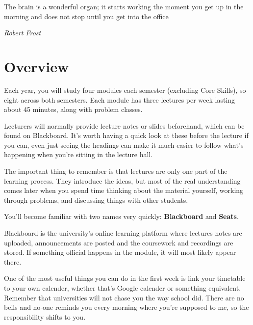 \epigraph{The brain is a wonderful organ; it starts working the moment you get up in the morning and does not stop until you get into the office}
{\textit{Robert Frost}}

\section{Overview}


Each year, you will study four modules each semester (excluding Core Skills), so eight across both semesters. Each module has three lectures per week lasting about 45 minutes, along with problem classes. 

Lecturers will normally provide lecture notes or slides beforehand, which can be found on Blackboard. It’s worth having a quick look at these before the lecture if you can, even just seeing the headings can make it much easier to follow what’s happening when you’re sitting in the lecture hall.

The important thing to remember is that lectures are only one part of the learning process. They introduce the ideas, but most of the real understanding comes later when you spend time thinking about the material yourself, working through problems, and discussing things with other students.




You'll become familiar with two names very quickly: \textbf{Blackboard} and \textbf{Seats}. 

Blackboard is the university's online learning platform where lectures notes are uploaded, announcements are posted and the coursework and recordings are stored. If something official happens in the module, it will most likely appear there. 

One of the most useful things you can do in the first week is link your timetable to your own calender, whether that's Google calender or something equivalent. Remember that universities will not chase you the way school did. There are no bells and no-one reminds you every morning where you're supposed to me, so the responsibility shifts to you. 

